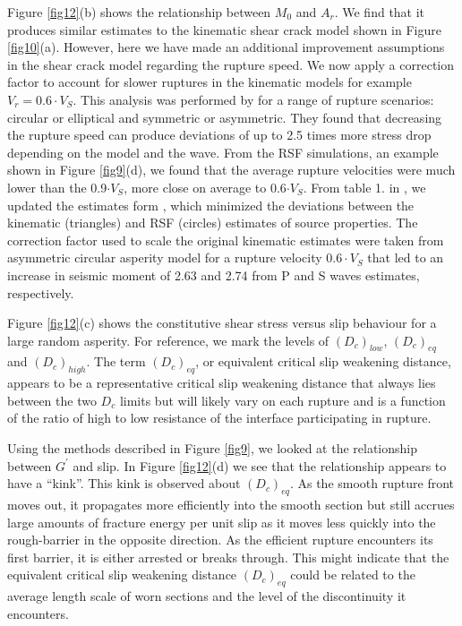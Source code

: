 \documentclass[final,3p, 11pt,authoryear]{elsarticle}
\begin{document}
Figure \ref{fig12}(b) shows the relationship between $M_{0}$ and $A_{r}$. We find that it produces similar estimates to the kinematic shear crack model shown in Figure \ref{fig10}(a). However, here we have made an additional improvement assumptions in the shear crack model regarding the rupture speed.  We now apply a correction factor to account for slower ruptures in the kinematic models for example $V_{r} = 0.6\cdot V_{S}$.  This analysis was performed by \citet{Kaneko2015} for a range of rupture scenarios: circular or elliptical and symmetric or asymmetric.  They found that decreasing the rupture speed can produce deviations of up to 2.5 times more stress drop depending on the model and the wave.  From the RSF simulations, an example shown in Figure \ref{fig9}(d), we found that the average rupture velocities were much lower than the 0.9$\cdot V_{S}$, more close on average to 0.6$\cdot V_{S}$.  From table 1. in \citet{Kaneko2015}, we updated the estimates form \citet{Selvadurai2019}, which minimized the deviations between the kinematic (triangles) and RSF (circles) estimates of source properties.  The correction factor used to scale the original kinematic estimates were taken from asymmetric circular asperity model for a rupture velocity $0.6\cdot V_{S}$ that led to an increase in seismic moment of 2.63 and 2.74 from P and S waves estimates, respectively.

Figure \ref{fig12}(c) shows the constitutive shear stress versus slip behaviour for a large random asperity. For reference, we mark the levels of $(D_{c})_{low}$, $(D_{c})_{eq}$ and $(D_{c})_{high}$.  The term $(D_{c})_{eq}$, or equivalent critical slip weakening distance, appears to be a representative critical slip weakening distance that always lies between the two $D_{c}$ limits but will likely vary on each rupture and is a function of the ratio of high to low resistance of the interface participating in rupture.  

Using the methods described in Figure \ref{fig9}, we looked at the relationship between $G^{'}$ and slip. In Figure \ref{fig12}(d) we see that the relationship appears to have a ``kink''.  This kink is observed about $(D_{c})_{eq}$. As the smooth rupture front moves out, it propagates more efficiently into the smooth section but still accrues large amounts of fracture energy per unit slip as it moves less quickly into the rough-barrier in the opposite direction. As the efficient rupture encounters its first barrier, it is either arrested or breaks through. This might indicate that the equivalent critical slip weakening distance $(D_{c})_{eq}$ could be related to the average length scale of worn sections and the level of the discontinuity it encounters.  
\end{document}
